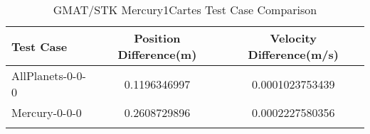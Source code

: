 \begin{table}[htbp!]
\centering
\caption{ GMAT/STK Mercury1Cartes Test Case Comparison}
      \begin{tabular}{lcc}
      \hline\hline
          Test Case & Position Difference(m) & Velocity Difference(m/s) \\
         \hline
         AllPlanets-0-0-0 & 0.1196346997 & 0.0001023753439 \\
         Mercury-0-0-0 & 0.2608729896 & 0.0002227580356 \\
      \hline\hline
      \label{Table: Mercury1CartesTable} 
\end{tabular}
\end{table}
